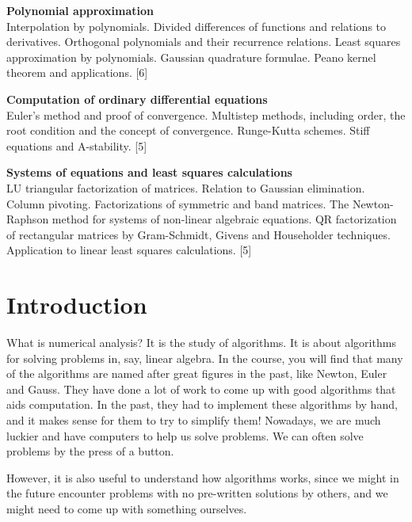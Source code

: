\documentclass[a4paper]{article}
\begin{document}
\maketitle
{\small
\noindent\textbf{Polynomial approximation}\\
Interpolation by polynomials. Divided differences of functions and relations to derivatives. Orthogonal polynomials and their recurrence relations. Least squares approximation by polynomials. Gaussian quadrature formulae. Peano kernel theorem and applications.\hspace*{\fill} [6]

\vspace{10pt}
\noindent\textbf{Computation of ordinary differential equations}\\
Euler's method and proof of convergence. Multistep methods, including order, the root condition and the concept of convergence. Runge-Kutta schemes. Stiff equations and A-stability.\hspace*{\fill} [5]

\vspace{10pt}
\noindent\textbf{Systems of equations and least squares calculations}\\
LU triangular factorization of matrices. Relation to Gaussian elimination. Column pivoting. Factorizations of symmetric and band matrices. The Newton-Raphson method for systems of non-linear algebraic equations. QR factorization of rectangular matrices by Gram-Schmidt, Givens and Householder techniques. Application to linear least squares calculations.\hspace*{\fill} [5]}

\tableofcontents
\setcounter{section}{-1}
\section{Introduction}
What is numerical analysis? It is the study of algorithms. It is about algorithms for solving problems in, say, linear algebra. In the course, you will find that many of the algorithms are named after great figures in the past, like Newton, Euler and Gauss. They have done a lot of work to come up with good algorithms that aids computation. In the past, they had to implement these algorithms by hand, and it makes sense for them to try to simplify them! Nowadays, we are much luckier and have computers to help us solve problems. We can often solve problems by the press of a button.

However, it is also useful to understand how algorithms works, since we might in the future encounter problems with no pre-written solutions by others, and we might need to come up with something ourselves.
\end{document}
